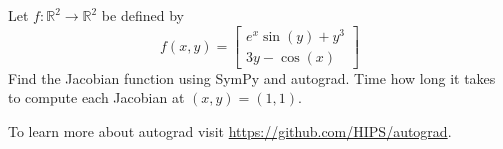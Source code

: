 \begin{problem}
\item Let $f: \mathbb{R}^2 \to \mathbb{R}^2$ be defined by
%
\begin{equation*}
f(x, y) =
\left[\begin{array}{c}
e^{x} \sin(y) + y^3 \\
3y - \cos(x)
\end{array}\right]
\end{equation*}
%
Find the Jacobian function using SymPy and autograd.  Time how long it takes to compute each Jacobian at $(x,y) = (1,1)$.
\end{problem}

To learn more about autograd visit \url{https://github.com/HIPS/autograd}.

